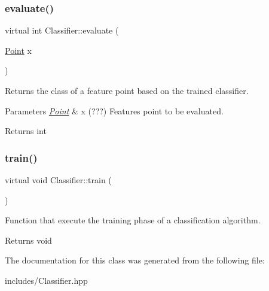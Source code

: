 \subsubsection{\texorpdfstring{evaluate()}{evaluate()}}
{\footnotesize\ttfamily virtual int Classifier\+::evaluate (\begin{DoxyParamCaption}\item[{\hyperlink{class_point}{Point}}]{x }\end{DoxyParamCaption})\hspace{0.3cm}{\ttfamily [pure virtual]}}



Returns the class of a feature point based on the trained classifier. 


\begin{DoxyParams}{Parameters}
{\em \hyperlink{class_point}{Point}} & x (???) Features point to be evaluated. \\
\hline
\end{DoxyParams}
\begin{DoxyReturn}{Returns}
int 
\end{DoxyReturn}
\mbox{\label{class_classifier_a4e2f077e6f1dce1ef0376a02b60e7c21}} 
\subsubsection{\texorpdfstring{train()}{train()}}
{\footnotesize\ttfamily virtual void Classifier\+::train (\begin{DoxyParamCaption}{ }\end{DoxyParamCaption})\hspace{0.3cm}{\ttfamily [pure virtual]}}



Function that execute the training phase of a classification algorithm. 

\begin{DoxyReturn}{Returns}
void 
\end{DoxyReturn}


The documentation for this class was generated from the following file\+:\begin{DoxyCompactItemize}
\item 
includes/Classifier.\+hpp\end{DoxyCompactItemize}

